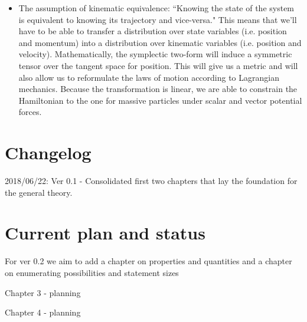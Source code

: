 \documentclass[11pt,letterpaper,fleqn]{memoir} %
\begin{document}
\begin{itemize}
	\item The assumption of kinematic equivalence: ``Knowing the state of the system is equivalent to knowing its trajectory and vice-versa." This means that we'll have to be able to transfer a distribution over state variables (i.e. position and momentum) into a distribution over kinematic variables (i.e. position and velocity). Mathematically, the symplectic two-form will induce a symmetric tensor over the tangent space for position. This will give us a metric and will also allow us to reformulate the laws of motion according to Lagrangian mechanics. Because the transformation is linear, we are able to constrain the Hamiltonian to the one for massive particles under scalar and vector potential forces.
\end{itemize}

\section*{Changelog}

\begin{description}
	\item 2018/06/22: Ver 0.1 - Consolidated first two chapters that lay the foundation for the general theory.
\end{description}

\section*{Current plan and status}

For ver 0.2 we aim to add a chapter on properties and quantities and a chapter on enumerating possibilities and statement sizes

\begin{description}
	\item Chapter 3 - planning
	\item Chapter 4 - planning
\end{description}



\cleardoublepage %

\tableofcontents* %

\cleardoublepage %


\mainmatter
\end{document}
